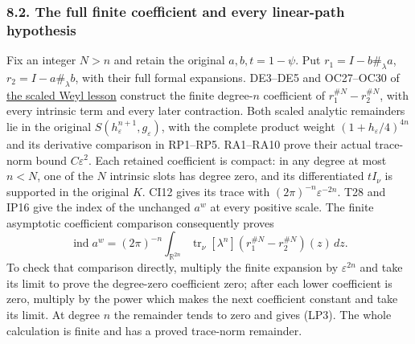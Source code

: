 \documentclass[
  11pt,
]{article}
\begin{document}
\subsubsection{8.2. The full finite coefficient and every linear-path
hypothesis}\label{the-full-finite-coefficient-and-every-linear-path-hypothesis}

Fix an integer \(N>n\) and retain the original \(a,b,t=1-\psi\). Put
\(r_1=I-b\#_\lambda a\), \(r_2=I-a\#_\lambda b\), with their full formal
expansions. DE3--DE5 and OC27--OC30 of
\href{scaled-weyl-index-degree.pdf}{the scaled Weyl lesson} construct the
finite degree-\(n\) coefficient of \(r_1^{\#N}-r_2^{\#N}\), with every
intrinsic term and every later contraction. Both scaled analytic
remainders lie in the original \(S(h_\varepsilon^{n+1},g_\varepsilon)\),
with the complete product weight \((1+h_\varepsilon/4)^{4n}\) and its
derivative comparison in RP1--RP5. RA1--RA10 prove their actual
trace-norm bound \(C\varepsilon^2\). Each retained coefficient is
compact: in any degree at most \(n<N\), one of the \(N\) intrinsic slots
has degree zero, and its differentiated \(tI_\nu\) is supported in the
original \(K\). CI12 gives its trace with
\((2\pi)^{-n}\varepsilon^{-2n}\). T28 and IP16 give the index of the
unchanged \(a^w\) at every positive scale. The finite asymptotic
coefficient comparison consequently proves \[
 \operatorname{ind}a^w=(2\pi)^{-n}
       \int_{\mathbb R^{2n}}\operatorname{tr}_\nu
            [\lambda^n](r_1^{\#N}-r_2^{\#N})(z)\,dz.
 \tag{LP3}
\] To check that comparison directly, multiply the finite expansion by
\(\varepsilon^{2n}\) and take its limit to prove the degree-zero
coefficient zero; after each lower coefficient is zero, multiply by the
power which makes the next coefficient constant and take its limit. At
degree \(n\) the remainder tends to zero and gives (LP3). The whole
calculation is finite and has a proved trace-norm remainder.
\end{document}
